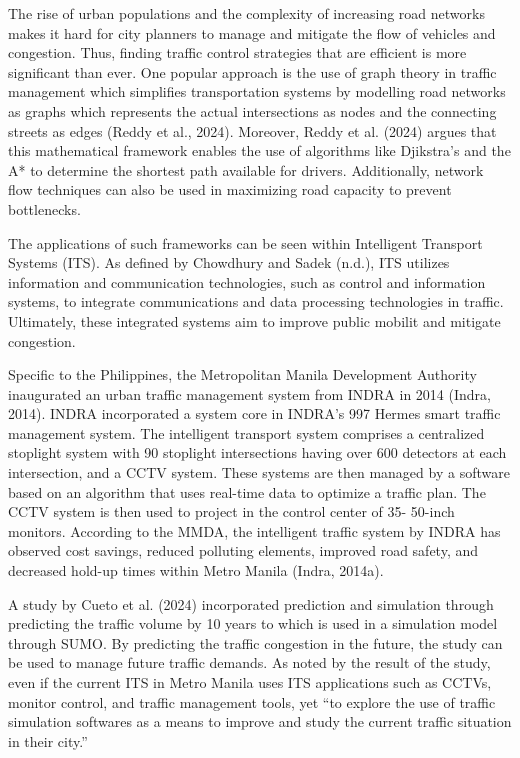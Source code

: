 The rise of urban populations and the complexity of increasing road networks makes it hard for city planners to manage and mitigate the flow of vehicles and congestion. Thus, finding traffic control strategies that are efficient is more significant than ever. One popular approach is the use of graph theory in traffic management which simplifies transportation systems by modelling road networks as graphs which represents the actual intersections as nodes and the connecting streets as edges (Reddy et al., 2024). Moreover, Reddy et al. (2024) argues that this mathematical framework enables the use of algorithms like Djikstra's and the A* to determine the shortest path available for drivers. Additionally, network flow techniques can also be used in maximizing road capacity to prevent bottlenecks.  


The applications of such frameworks can be seen within Intelligent Transport Systems (ITS). As defined by Chowdhury and Sadek (n.d.), ITS utilizes information and communication technologies, such as control and information systems, to integrate communications and data processing technologies in traffic. Ultimately, these integrated systems aim to improve public mobilit and mitigate congestion. 

Specific to the Philippines, the Metropolitan Manila Development Authority inaugurated an urban traffic management system from INDRA in 2014 (Indra, 2014). INDRA incorporated a system core in INDRA's 997 Hermes smart traffic management system. The intelligent transport system comprises a centralized stoplight system with 90 stoplight intersections having over 600 detectors at each intersection, and a CCTV system. These systems are then managed by a software based on an algorithm that uses real-time data to optimize a traffic plan. The CCTV system is then used to project in the control center of 35- 50-inch monitors. According to the MMDA, the intelligent traffic system by INDRA has observed cost savings, reduced polluting elements, improved road safety, and decreased hold-up times within Metro Manila (Indra, 2014a).

A study by Cueto et al. (2024) incorporated prediction and simulation through predicting the traffic volume by 10 years to which is used in a simulation model through SUMO. By predicting the traffic congestion in the future, the study can be used to manage future traffic demands. As noted by the result of the study, even if the current ITS in Metro Manila uses ITS applications such as CCTVs, monitor control, and traffic management tools, yet “to explore the use of traffic simulation softwares as a means to improve and study the current traffic situation in their city.”

